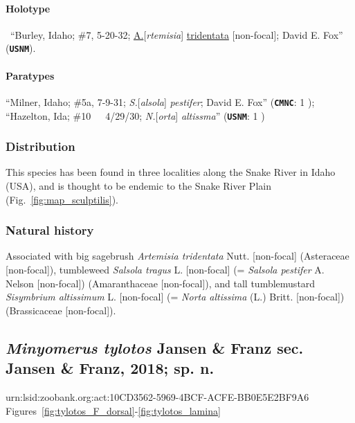 \documentclass[fleqn,10pt,lineno]{wlpeerj} %
\begin{document}
			\paragraph{Holotype}
				\female~``Burley, Idaho; \#7, 5-20-32; \underline{A.}[\textit{rtemisia}] \underline{tridentata} [non-focal]; David E. Fox'' (\texttt{\textbf{USNM}}).
			\paragraph{Paratypes}
				``Milner, Idaho; \#5a, 7-9-31; \textit{S.}[\textit{alsola}] \textit{pestifer}; David E. Fox'' (\texttt{\textbf{CMNC}}: 1 \female);
				``Hazelton, Ida; \#10~~~4/29/30; \textit{N.}[\textit{orta}] \textit{altissma}'' (\texttt{\textbf{USNM}}: 1 \male)
		\subsubsection*{Distribution}
			This species has been found in three localities along the Snake River in Idaho (USA), and is thought to be endemic to the Snake River Plain (Fig.~\ref{fig:map_sculptilis}).
		\subsubsection*{Natural history}
			Associated with big sagebrush \textit{Artemisia tridentata} Nutt. [non-focal] (Asteraceae [non-focal]), tumbleweed \textit{Salsola tragus} L. [non-focal] (= \textit{Salsola pestifer} A. Nelson [non-focal]) (Amaranthaceae [non-focal]), and tall tumblemustard \textit{Sisymbrium altissimum} L. [non-focal] (= \textit{Norta altissima} (L.) Britt. [non-focal]) (Brassicaceae [non-focal]).

	\subsection*{\textit{Minyomerus tylotos} Jansen \& Franz sec. Jansen \& Franz, 2018; sp. n.}\label{ssec:tylotos}
		urn:lsid:zoobank.org:act:10CD3562-5969-4BCF-ACFE-BB0E5E2BF9A6\\
		Figures~\ref{fig:tylotos_F_dorsal}-\ref{fig:tylotos_lamina}
\end{document}
